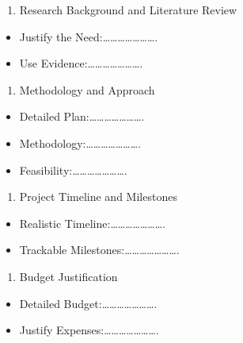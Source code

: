 \documentclass[
  letterpaper,
  DIV=11,
  numbers=noendperiod]{scrreprt}
\providecommand{\tightlist}{%
  \setlength{\itemsep}{0pt}\setlength{\parskip}{0pt}}\usepackage{longtable,booktabs,array}
\begin{document}
\begin{enumerate}
\def\labelenumi{\arabic{enumi}.}
\setcounter{enumi}{2}
\tightlist
\item
  Research Background and Literature Review
\end{enumerate}

\begin{itemize}
\item
  Justify the Need:\ldots\ldots\ldots\ldots\ldots\ldots\ldots.
\item
  Use Evidence:\ldots\ldots\ldots\ldots\ldots\ldots\ldots.
\end{itemize}

\begin{enumerate}
\def\labelenumi{\arabic{enumi}.}
\setcounter{enumi}{3}
\tightlist
\item
  Methodology and Approach
\end{enumerate}

\begin{itemize}
\item
  Detailed Plan:\ldots\ldots\ldots\ldots\ldots\ldots\ldots.
\item
  Methodology:\ldots\ldots\ldots\ldots\ldots\ldots\ldots.
\item
  Feasibility:\ldots\ldots\ldots\ldots\ldots\ldots\ldots.
\end{itemize}

\begin{enumerate}
\def\labelenumi{\arabic{enumi}.}
\setcounter{enumi}{4}
\tightlist
\item
  Project Timeline and Milestones
\end{enumerate}

\begin{itemize}
\item
  Realistic Timeline:\ldots\ldots\ldots\ldots\ldots\ldots\ldots.
\item
  Trackable Milestones:\ldots\ldots\ldots\ldots\ldots\ldots\ldots.
\end{itemize}

\begin{enumerate}
\def\labelenumi{\arabic{enumi}.}
\setcounter{enumi}{5}
\tightlist
\item
  Budget Justification
\end{enumerate}

\begin{itemize}
\item
  Detailed Budget:\ldots\ldots\ldots\ldots\ldots\ldots\ldots.
\item
  Justify Expenses:\ldots\ldots\ldots\ldots\ldots\ldots\ldots.
\end{itemize}
\end{document}
